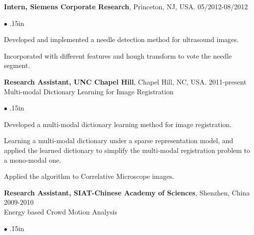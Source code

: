 \documentclass[line,margin]{res}
\newenvironment{bullets}{\begin{list}{\tiny$\bullet$}{\topsep 0pt \itemsep -2pt \leftmargin .15in}}{\vspace*{4pt}\end{list}}
\begin{document}
\begin{resume}
\textbf{Intern, Siemens Corporate Research}, Princeton, NJ, USA. \hfill      05/2012-08/2012 
\begin{bullets} 
\item Developed and implemented a needle detection method for ultrasound images. 
\item Incorporated with different features and hough transform to vote the needle segment.
\end{bullets}
\vspace{-.1in}
\textbf{Research Assistant, UNC Chapel Hill}, Chapel Hill, NC, USA.  \hfill      2011-present \\
Multi-modal Dictionary Learning for Image Registration  %
\begin{bullets}
\item Developed a multi-modal dictionary learning method for image registration. 
\item Learning a multi-modal dictionary under a sparse representation model, and applied the learned dictionary to simplify the multi-modal registration problem to a mono-modal one. 
\item Applied the algorithm to Correlative Microscope images.
\end{bullets}
\vspace{-.1in}
\textbf{Research Assistant, SIAT-Chinese Academy of Sciences}, Shenzhen, China   \hfill      2009-2010 \\ %
Energy based Crowd Motion Analysis
\begin{bullets}

\end{bullets}
\end{resume}
\end{document}
